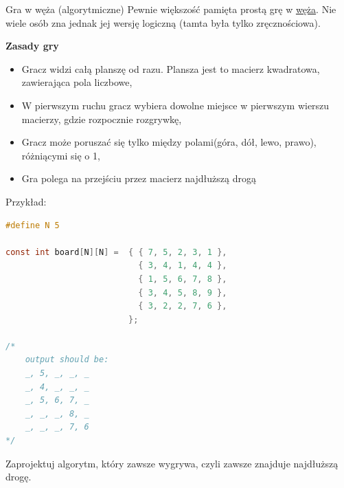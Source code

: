 \begin{exercise}{Gra w węża (algorytmiczne)}{}
Pewnie większość pamięta prostą grę w \href{https://www.youtube.com/watch?v=AaYuKn1pCBM}{węża}. Nie wiele osób zna jednak jej wersję logiczną (tamta była tylko zręcznościowa).

\textbf{Zasady gry}
\begin{itemize}
    \item Gracz widzi całą planszę od razu. Plansza jest to macierz kwadratowa, zawierająca pola liczbowe,
    \item W pierwszym ruchu gracz wybiera dowolne miejsce w pierwszym wierszu macierzy, gdzie rozpocznie rozgrywkę,
    \item Gracz może poruszać się tylko między polami(góra, dół, lewo, prawo), różniącymi się o 1,
    \item Gra polega na przejściu przez macierz najdłuższą drogą
\end{itemize}

Przykład:
\begin{lstlisting}[language=C,style=C99]
#define N 5

const int board[N][N] =  { { 7, 5, 2, 3, 1 },
                           { 3, 4, 1, 4, 4 },
                           { 1, 5, 6, 7, 8 },
                           { 3, 4, 5, 8, 9 },
                           { 3, 2, 2, 7, 6 },
                         };
                         
/* 
    output should be: 
    _, 5, _, _, _
    _, 4, _, _, _
    _, 5, 6, 7, _
    _, _, _, 8, _
    _, _, _, 7, 6
*/
\end{lstlisting}

Zaprojektuj algorytm, który zawsze wygrywa, czyli zawsze znajduje najdłuższą drogę.
\end{exercise}